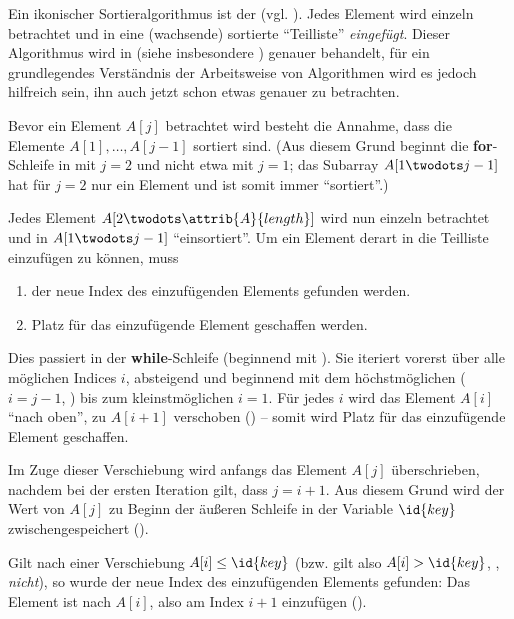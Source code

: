 Ein ikonischer Sortieralgorithmus ist der  (vgl. \cite[74]{taocp3}). Jedes Element wird einzeln betrachtet und in eine (wachsende) sortierte \enquote{Teilliste} \emph{eingefügt}. Dieser Algorithmus wird in  (siehe insbesondere ) genauer behandelt, für ein grundlegendes Verständnis der Arbeitsweise von Algorithmen wird es jedoch hilfreich sein, ihn auch jetzt schon etwas genauer zu betrachten.



Bevor ein Element $A[j]$ betrachtet wird besteht die Annahme, dass die Elemente $A[1], \ldots, A[j - 1]$ sortiert sind. (Aus diesem Grund beginnt die \textbf{for}-Schleife in  mit $j = 2$ und nicht etwa mit $j = 1$; das Subarray $A[1 \twodots j - 1]$ hat für $j = 2$ nur ein Element und ist somit immer \enquote{sortiert}.)

Jedes Element $A[2 \twodots \attrib{A}{length}]$ wird nun einzeln betrachtet und in $A[1 \twodots j - 1]$ \enquote{einsortiert}. Um ein Element derart in die Teilliste einzufügen zu können, muss
\begin{enumerate}[nosep, label=(\alph*)]
    \item der neue Index des einzufügenden Elements gefunden werden.
    \item Platz für das einzufügende Element geschaffen werden.
\end{enumerate}
Dies passiert in der \textbf{while}-Schleife (beginnend mit ). Sie iteriert vorerst über alle möglichen Indices $i$, absteigend und beginnend mit dem höchstmöglichen ($i = j - 1$, ) bis zum kleinstmöglichen $i = 1$. Für jedes $i$ wird das Element $A[i]$ \enquote{nach oben}, zu $A[i + 1]$ verschoben () -- somit wird Platz für das einzufügende Element geschaffen. 

Im Zuge dieser Verschiebung wird anfangs das Element $A[j]$ überschrieben, nachdem bei der ersten Iteration gilt, dass $j = i + 1$. Aus diesem Grund wird der Wert von $A[j]$ zu Beginn der äußeren Schleife in der Variable $\id{key}$ zwischengespeichert ().

Gilt nach einer Verschiebung $A[i] \leq \id{key}$ (bzw. gilt also $A[i] > \id{key}$, , \emph{nicht}), so wurde der neue Index des einzufügenden Elements gefunden: Das Element ist nach $A[i]$, also am Index $i + 1$ einzufügen ().

